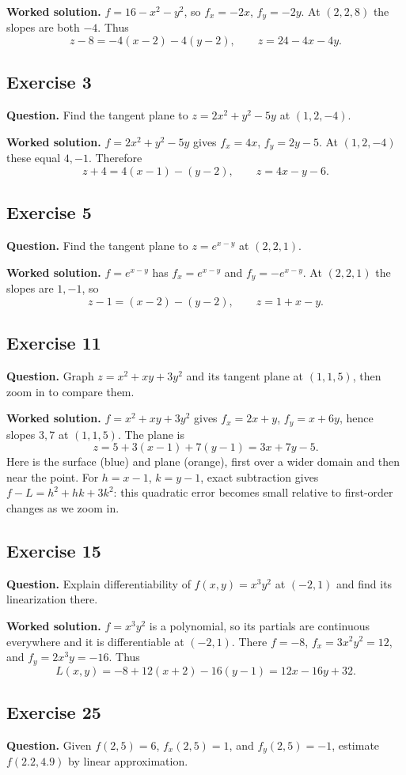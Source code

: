 \documentclass[11pt]{article}
\newcommand{\ex}[1]{\Needspace{8\baselineskip}\subsection*{Exercise #1}}
\newcommand{\ans}[1]{\boxed{#1}}
\begin{document}
\textbf{Worked solution.}
$f=16-x^2-y^2$, so $f_x=-2x$, $f_y=-2y$. At $(2,2,8)$ the slopes are both $-4$. Thus
\[z-8=-4(x-2)-4(y-2),\qquad\ans{z=24-4x-4y}.\]
\ex{3}
\textbf{Question.} Find the tangent plane to $z=2x^2+y^2-5y$ at $(1,2,-4)$.

\textbf{Worked solution.}
$f=2x^2+y^2-5y$ gives $f_x=4x$, $f_y=2y-5$. At $(1,2,-4)$ these equal $4,-1$. Therefore
\[z+4=4(x-1)-(y-2),\qquad\ans{z=4x-y-6}.\]
\ex{5}
\textbf{Question.} Find the tangent plane to $z=e^{x-y}$ at $(2,2,1)$.

\textbf{Worked solution.}
$f=e^{x-y}$ has $f_x=e^{x-y}$ and $f_y=-e^{x-y}$. At $(2,2,1)$ the slopes are $1,-1$, so
\[z-1=(x-2)-(y-2),\qquad\ans{z=1+x-y}.\]
\ex{11}
\textbf{Question.} Graph $z=x^2+xy+3y^2$ and its tangent plane at $(1,1,5)$, then zoom in to compare them.

\textbf{Worked solution.}
$f=x^2+xy+3y^2$ gives $f_x=2x+y$, $f_y=x+6y$, hence slopes $3,7$ at $(1,1,5)$. The plane is
\[\ans{z=5+3(x-1)+7(y-1)=3x+7y-5}.\]
Here is the surface (blue) and plane (orange), first over a wider domain and then near the point. For $h=x-1$, $k=y-1$, exact subtraction gives $f-L=h^2+hk+3k^2$: this quadratic error becomes small relative to first-order changes as we zoom in.
\begin{center}\end{center}
\begin{center}\end{center}
\ex{15}
\textbf{Question.} Explain differentiability of $f(x,y)=x^3y^2$ at $(-2,1)$ and find its linearization there.

\textbf{Worked solution.}
$f=x^3y^2$ is a polynomial, so its partials are continuous everywhere and it is differentiable at $(-2,1)$. There $f=-8$, $f_x=3x^2y^2=12$, and $f_y=2x^3y=-16$. Thus
\[\ans{L(x,y)=-8+12(x+2)-16(y-1)=12x-16y+32}.\]
\ex{25}
\textbf{Question.} Given $f(2,5)=6$, $f_x(2,5)=1$, and $f_y(2,5)=-1$, estimate $f(2.2,4.9)$ by linear approximation.
\end{document}
